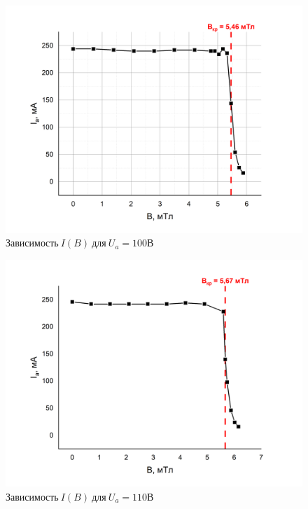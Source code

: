 \documentclass[a4paper,12pt]{article}
\begin{document}
\begin{figure}[h!]
	\begin{center}
	\includegraphics[scale=0.5]{graph6}
	\end{center}
	\caption{$Зависимость \ I(B) \ для \ U_a = 100В$}
	\end{figure}
	
\begin{figure}[h!]
	\begin{center}
	\includegraphics[scale=0.5]{graph7}
	\end{center}
	\caption{$Зависимость \ I(B) \ для \ U_a = 110В$}
	\end{figure}
\end{document}
